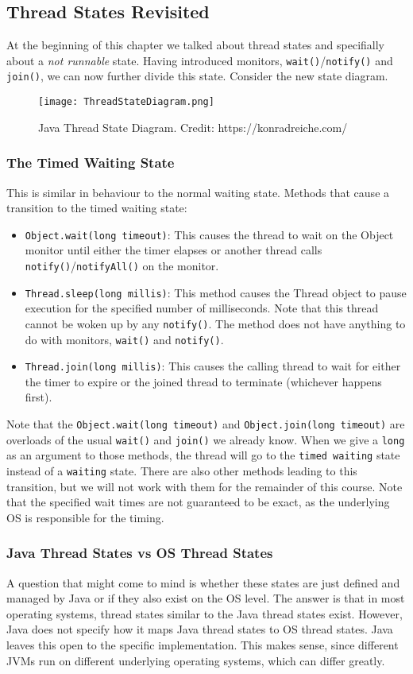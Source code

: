 \documentclass[main.tex]{subfiles}
\begin{document}
\subsection{Thread States Revisited}
At the beginning of this chapter we talked about thread states and specifially about a \textit{not runnable} state. Having introduced monitors, \texttt{wait()}/\texttt{notify()} and \texttt{join()}, we can now further divide this state. Consider the new state diagram.
\begin{figure}[H]
    \centering
    \texttt{[image: ThreadStateDiagram.png]}
    \caption{Java Thread State Diagram. Credit: https://konradreiche.com/}
\end{figure}
\subsubsection{The Timed Waiting State}
This is similar in behaviour to the normal waiting state. Methods that cause a transition to the timed waiting state:
\begin{itemize}
    \item \texttt{Object.wait(long timeout)}: This causes the thread to wait on the Object monitor until either the timer elapses or another thread calls \texttt{notify()}/\texttt{notifyAll()} on the monitor.
    \item \texttt{Thread.sleep(long millis)}: This method causes the Thread object to pause execution for the specified number of milliseconds. Note that this thread cannot be woken up by any \texttt{notify()}. The method does not have anything to do with monitors, \texttt{wait()} and \texttt{notify()}.
    \item \texttt{Thread.join(long millis)}: This causes the calling thread to wait for either the timer to expire or the joined thread to terminate (whichever happens first).
\end{itemize}
Note that the \texttt{Object.wait(long timeout)} and \texttt{Object.join(long timeout)} are overloads of the usual \texttt{wait()} and \texttt{join()} we already know. When we give a \texttt{long} as an argument to those methods, the thread will go to the \texttt{timed waiting} state instead of a \texttt{waiting} state. There are also other methods leading to this transition, but we will not work with them for the remainder of this course. Note that the specified wait times are not guaranteed to be exact, as the underlying OS is responsible for the timing.
\subsubsection{Java Thread States vs OS Thread States}
A question that might come to mind is whether these states are just defined and managed by Java or if they also exist on the OS level. The answer is that in most operating systems, thread states similar to the Java thread states exist. However, Java does not specify how it maps Java thread states to OS thread states. Java leaves this open to the specific implementation. This makes sense, since different JVMs run on different underlying operating systems, which can differ greatly.
\end{document}
